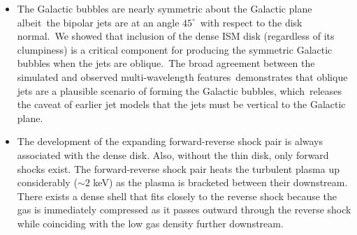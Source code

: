\documentclass[fleqn,usenatbib,useAMS]{mnras}
\begin{document}
\begin{itemize}

\item The Galactic bubbles are nearly symmetric about the Galactic plane albeit\
      the bipolar jets are at an angle $45^{\circ}$\
      with respect to the disk normal.\
      We showed that inclusion of the dense ISM disk (regardless of its clumpiness) is a critical component for producing the symmetric Galactic bubbles when the jets are oblique.\
      The broad agreement between the simulated and observed multi-wavelength features\
      demonstrates that oblique jets are a plausible scenario of forming the Galactic bubbles, which\
      releases the caveat of earlier jet models that the jets must be vertical to the Galactic plane.\


\item The development of the expanding forward-reverse shock pair is always associated with the dense disk. Also, without the thin disk, only forward shocks exist. The forward-reverse shock pair heats the turbulent plasma up considerably ($\sim2$ keV) as the plasma is bracketed between their downstream. There exists a dense shell that fits closely to the reverse shock because the gas is immediately compressed as it passes outward through the reverse shock while coinciding with the low gas density further downstream.


\end{itemize}
\end{document}
